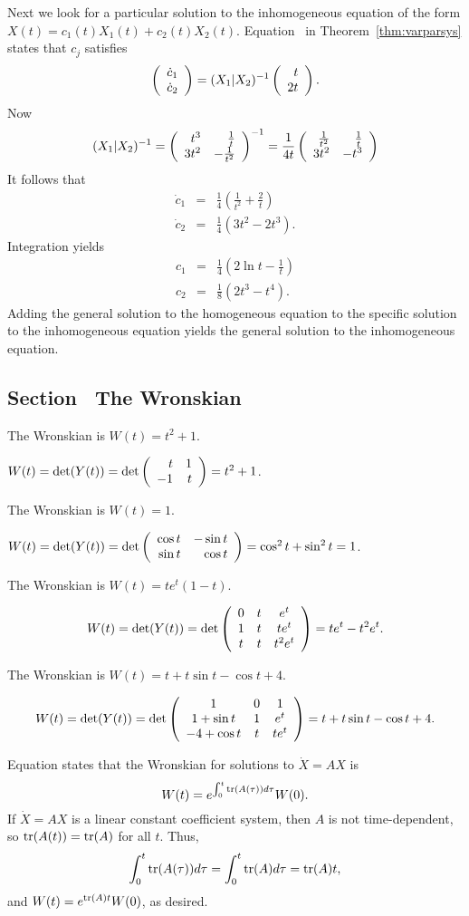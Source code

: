 \documentclass{ximera}
\begin{document}
Next we look for a particular solution to the inhomogeneous equation of 
the form $X(t)=c_1(t)X_1(t)+c_2(t)X_2(t)$.  Equation~ in
Theorem~\ref{thm:varparsys} states that $c_j$ satisfies
\[
\left(\begin{array}{r} \dot{c}_1 \\ \dot{c}_2\end{array}\right) = (X_1|X_2)^{-1} \left(\begin{array}{r} t \\ 2t\end{array}\right).
\]
Now 
\[
 (X_1|X_2)^{-1} = \left(\begin{array}{rr} t^3 & \frac{1}{t}\\ 3t^2 &-\frac{1}{t^2}\end{array}\right)^{-1} = 
\frac{1}{4t}\left(\begin{array}{rr} \frac{1}{t^2} & \frac{1}{t}\\ 3t^2 &-t^3\end{array}\right)
\]
It follows that 
\begin{eqnarray*}
\dot{c}_1 & = & \frac{1}{4}\left(\frac{1}{t^2}+\frac{2}{t}\right) \\
\dot{c}_2 & = & \frac{1}{4}\left(3t^2-2t^3\right).
\end{eqnarray*}
Integration yields
\begin{eqnarray*} 
c_1 & = & \frac{1}{4}\left(2\ln t - \frac{1}{t}\right)\\
c_2 & = & \frac{1}{8}\left(2t^3-t^4\right).
\end{eqnarray*}
Adding the general solution to the homogeneous equation to the specific
solution to the inhomogeneous equation yields the general solution to the
inhomogeneous equation.


\subsection*{Section~\protect{\ref{S:wronskian}} The Wronskian}

 \ans The Wronskian is $W(t) = t^2 + 1$.

\soln $W(t) = \det(Y(t)) = \det\left(\begin{array}{rr} t & 1\\ -1 &t\end{array}\right) = t^2 + 1$.

 \ans The Wronskian is $W(t) = 1$.

\soln $W(t) = \det(Y(t)) = \det\left(\begin{array}{rr} \cos t & -\sin t\\ \sin t &\cos t\end{array}\right) =
\cos^2 t + \sin^2 t = 1$.

 \ans The Wronskian is $W(t) = te^t(1 - t)$.

\soln
\[
W(t) = \det(Y(t)) = \det\left(\begin{array}{ccc} 0 & t & e^t \\ 1 & t & te^t \\ t & t & t^2e^t\end{array}\right)
= te^t - t^2e^t.
\]

 \ans The Wronskian is $W(t) = t + t\sin t - \cos t + 4$.

\soln
\[
W(t) = \det(Y(t)) =
\det\left(\begin{array}{ccc} 1 & 0 & 1 \\ 1 + \sin t & 1 & e^t \\ -4 + \cos t & t & te^t\end{array}\right) =
t + t\sin t - \cos t + 4.
\]

 Equation 
states that the Wronskian for solutions to $\dot{X} = AX$ is
\[
W(t) = e^{\int_0^t{\rm tr}(A(\tau))d\tau}W(0).
\]
If $\dot{X} = AX$ is a linear constant coefficient system, then $A$ is not
time-dependent, so ${\rm tr}(A(t)) = {\rm tr}(A)$ for all $t$.  Thus,
\[
\int_0^t{\rm tr}(A(\tau))d\tau = \int_0^t{\rm tr}(A)d\tau = {\rm tr}(A)t,
\]
and $W(t) = e^{{\rm tr}(A)t}W(0)$, as desired.
\end{document}
